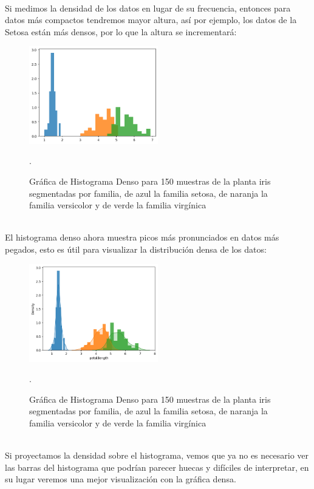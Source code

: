 \documentclass{article}
\begin{document}
\hfill\hfill\\
Si medimos la densidad de los datos en lugar de su frecuencia, entonces para datos más compactos tendremos mayor altura, así por ejemplo, los datos de la Setosa están más densos, por lo que la altura se incrementará:
\begin{figure}[h]
    \centering
    \includegraphics[width=0.5\textwidth]{figures/hist2.png}
    \captionsetup{width=0.8\textwidth}
    \caption{Gráfica de Histograma Denso para 150 muestras de la planta iris segmentadas por familia, de azul la familia setosa, de naranja la familia versicolor y de verde la familia virgínica}.
    \label{fig:hist2}
\end{figure}
\\
El histograma denso ahora muestra picos más pronunciados en datos más pegados, esto es útil para visualizar la distribución densa de los datos:
\begin{figure}[h]
    \centering
    \includegraphics[width=0.5\textwidth]{figures/hist3.png}
    \captionsetup{width=0.8\textwidth}
    \caption{Gráfica de Histograma Denso para 150 muestras de la planta iris segmentadas por familia, de azul la familia setosa, de naranja la familia versicolor y de verde la familia virgínica}.
    \label{fig:hist3}
\end{figure}
\\
Si proyectamos la densidad sobre el histograma, vemos que ya no es necesario ver las barras del histograma que podrían parecer huecas y difíciles de interpretar, en su lugar veremos una mejor visualización con la gráfica densa.
\end{document}
